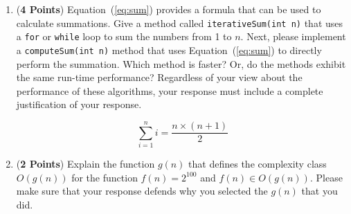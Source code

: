 \documentclass[12pt]{article}
\begin{document}
\begin{enumerate}
\begin{enumerate}
    \item ({\bf 4 Points}) Equation~(\ref{eq:sum}) provides a formula that can be used to calculate summations.  Give a
      method called {\tt iterativeSum(int n)} that uses a {\tt for} or {\tt while} loop to sum the numbers from 1 to
      $n$.  Next, please implement a {\tt computeSum(int n)} method that uses Equation~(\ref{eq:sum}) to directly
      perform the summation.  Which method is faster?  Or, do the methods exhibit the same run-time performance?
      Regardless of your view about the performance of these algorithms, your response must include a complete
      justification of your response.

      \begin{equation}
        \sum_{i=1}^{n}i = \frac{n \times (n+1)}{2}
        \label{eq:sum}
      \end{equation}

    \item ({\bf 2 Points}) Explain the function $g(n)$ that defines the complexity class $O(g(n))$ for the function
      $f(n) = 2^{100}$ and $f(n) \in O(g(n))$.  Please make sure that your response defends why you selected the $g(n)$
      that you did.










\end{enumerate}



\end{enumerate}
\end{document}
